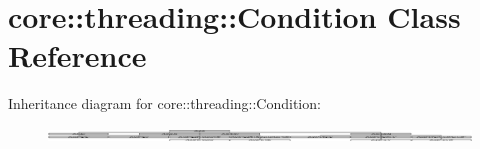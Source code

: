 \hypertarget{classcore_1_1threading_1_1_condition}{\section{core\-:\-:threading\-:\-:Condition Class Reference}
\label{classcore_1_1threading_1_1_condition}
}
Inheritance diagram for core\-:\-:threading\-:\-:Condition\-:\begin{figure}[H]
\begin{center}
\leavevmode
\includegraphics[height=0.390720cm]{classcore_1_1threading_1_1_condition}
\end{center}
\end{figure}
